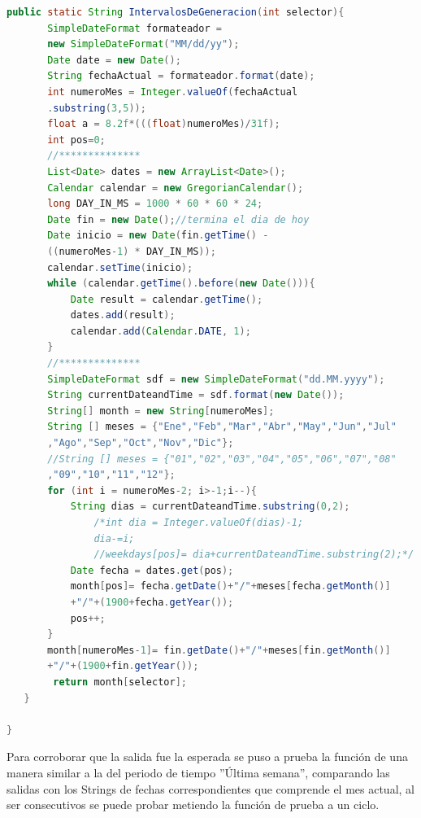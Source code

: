 \begin{lstlisting}[language= Java, frame=single]
   public static String IntervalosDeGeneracion(int selector){
       SimpleDateFormat formateador = 
       new SimpleDateFormat("MM/dd/yy");
       Date date = new Date();
       String fechaActual = formateador.format(date);
       int numeroMes = Integer.valueOf(fechaActual
       .substring(3,5));
       float a = 8.2f*(((float)numeroMes)/31f);
       int pos=0;
       //**************
       List<Date> dates = new ArrayList<Date>();
       Calendar calendar = new GregorianCalendar();
       long DAY_IN_MS = 1000 * 60 * 60 * 24;
       Date fin = new Date();//termina el dia de hoy
       Date inicio = new Date(fin.getTime() - 
       ((numeroMes-1) * DAY_IN_MS));
       calendar.setTime(inicio);
       while (calendar.getTime().before(new Date())){
           Date result = calendar.getTime();
           dates.add(result);
           calendar.add(Calendar.DATE, 1);
       }
       //**************
       SimpleDateFormat sdf = new SimpleDateFormat("dd.MM.yyyy");
       String currentDateandTime = sdf.format(new Date());
       String[] month = new String[numeroMes];
       String [] meses = {"Ene","Feb","Mar","Abr","May","Jun","Jul"
       ,"Ago","Sep","Oct","Nov","Dic"};
       //String [] meses = {"01","02","03","04","05","06","07","08"
       ,"09","10","11","12"};
       for (int i = numeroMes-2; i>-1;i--){
           String dias = currentDateandTime.substring(0,2);
               /*int dia = Integer.valueOf(dias)-1;
               dia-=i;
               //weekdays[pos]= dia+currentDateandTime.substring(2);*/
           Date fecha = dates.get(pos);
           month[pos]= fecha.getDate()+"/"+meses[fecha.getMonth()]
           +"/"+(1900+fecha.getYear());
           pos++;
       }
       month[numeroMes-1]= fin.getDate()+"/"+meses[fin.getMonth()]
       +"/"+(1900+fin.getYear());
        return month[selector];
   }

}

\end{lstlisting}


Para corroborar que la salida fue la esperada se puso a prueba la función de una manera similar a la del periodo de tiempo ''Última semana'', comparando las salidas con los Strings de fechas correspondientes que comprende el mes actual, al ser consecutivos se puede probar metiendo la función de prueba a un ciclo.

